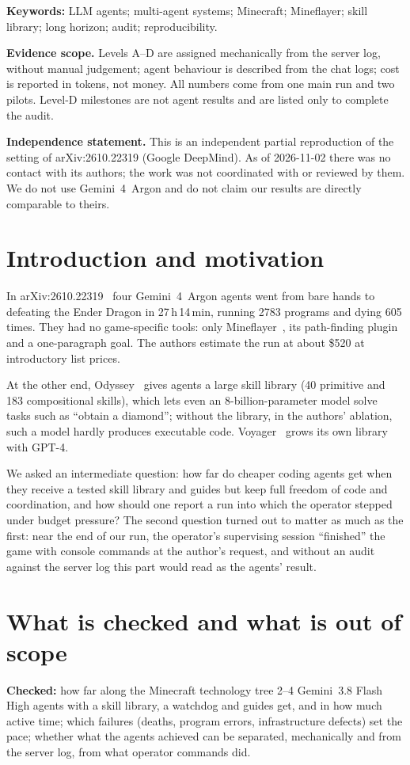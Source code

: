 \documentclass[11pt]{article}
\begin{document}
\noindent\textbf{Keywords:} LLM agents; multi-agent systems; Minecraft; Mineflayer; skill library; long horizon; audit; reproducibility.

\medskip
\noindent\textbf{Evidence scope.} Levels A--D are assigned mechanically from the server log, without manual judgement; agent behaviour is described from the chat logs; cost is reported in tokens, not money. All numbers come from one main run and two pilots. Level-D milestones are not agent results and are listed only to complete the audit.

\smallskip
\noindent\textbf{Independence statement.} This is an independent partial reproduction of the setting of arXiv:2610.22319 (Google DeepMind). As of 2026-11-02 there was no contact with its authors; the work was not coordinated with or reviewed by them. We do not use Gemini~4~Argon and do not claim our results are directly comparable to theirs.


\section{Introduction and motivation}
In arXiv:2610.22319~\citep{faldor2026} four Gemini~4~Argon agents went from bare hands to defeating the Ender Dragon in 27\,h\,14\,min, running 2783 programs and dying 605 times. They had no game-specific tools: only Mineflayer~\citep{mineflayer}, its path-finding plugin and a one-paragraph goal. The authors estimate the run at about \$520 at introductory list prices.

At the other end, Odyssey~\citep{odyssey} gives agents a large skill library (40 primitive and 183 compositional skills), which lets even an 8-billion-parameter model solve tasks such as ``obtain a diamond''; without the library, in the authors' ablation, such a model hardly produces executable code. Voyager~\citep{voyager} grows its own library with GPT-4.

We asked an intermediate question: how far do cheaper coding agents get when they receive a tested skill library and guides but keep full freedom of code and coordination, and how should one report a run into which the operator stepped under budget pressure? The second question turned out to matter as much as the first: near the end of our run, the operator's supervising session ``finished'' the game with console commands at the author's request, and without an audit against the server log this part would read as the agents' result.

\section{What is checked and what is out of scope}
\textbf{Checked:} how far along the Minecraft technology tree 2--4 Gemini~3.8 Flash High agents with a skill library, a watchdog and guides get, and in how much active time; which failures (deaths, program errors, infrastructure defects) set the pace; whether what the agents achieved can be separated, mechanically and from the server log, from what operator commands did.
\end{document}
